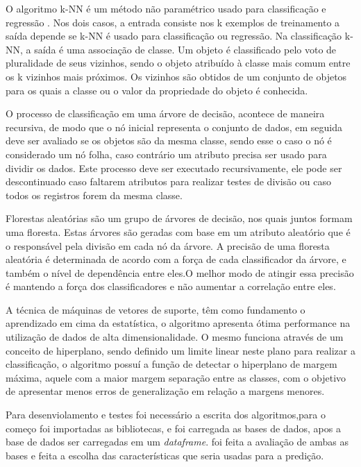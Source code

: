 O algoritmo k-NN é um método não paramétrico usado para classificação e regressão . Nos dois casos, a entrada consiste nos k exemplos de treinamento a saída depende se k-NN é usado para classificação ou regressão. Na classificação k-NN, a saída é uma associação de classe. Um objeto é classificado pelo voto de pluralidade de seus vizinhos, sendo o objeto atribuído à classe mais comum entre os k vizinhos mais próximos. Os vizinhos são obtidos de um conjunto de objetos para os quais a classe ou o valor da propriedade do objeto é conhecida\cite{KamgarParsi1985}.

O processo de classificação em uma árvore de decisão, acontece de maneira recursiva, de modo que o nó inicial representa o conjunto de dados, em seguida deve ser avaliado se os objetos são da mesma classe, sendo esse o caso o nó é considerado um nó folha, caso contrário um atributo precisa ser usado para dividir os dados. Este processo deve ser executado recursivamente, ele pode ser descontinuado caso faltarem atributos para realizar testes de divisão ou caso todos os registros forem da mesma classe\cite{castro}.

Florestas aleatórias são um grupo de árvores de decisão, nos quais juntos formam uma floresta. Estas árvores são geradas com base em um atributo aleatório que é o responsável pela divisão em cada nó da árvore. A precisão de uma floresta aleatória é determinada de acordo com a força de cada classificador da árvore, e também o nível de dependência entre eles.O melhor modo de atingir essa precisão é mantendo a força dos classificadores e não aumentar a correlação entre eles\cite{castro}.

A técnica de máquinas de vetores de suporte, têm como fundamento o aprendizado em cima da estatística, o algoritmo apresenta ótima performance na utilização de dados de alta dimensionalidade. O mesmo funciona através de um conceito de hiperplano, sendo definido um limite linear neste plano para realizar a classificação, o algoritmo possuí a função de detectar o hiperplano de margem máxima, aquele com a maior margem separação entre as classes, com o objetivo de apresentar menos erros de generalização em relação a margens menores\cite{Tan2009}.

Para desenviolamento e testes foi necessário a escrita dos algoritmos,para o começo foi importadas as bibliotecas, e foi carregada as bases de dados, apos a base de dados ser carregadas em um \textit{dataframe}. foi feita a avaliação de ambas as bases e feita a escolha das características que seria usadas para a predição.

